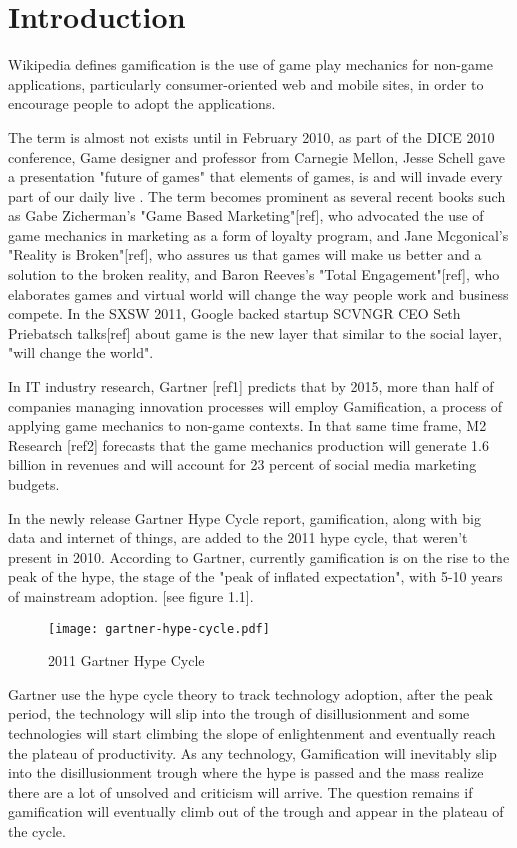 \chapter{Introduction}

Wikipedia defines gamification is the use of game play mechanics for non-game applications, particularly consumer-oriented web and mobile sites, in order to encourage people to adopt the applications. 

The term is almost not exists until in February 2010, as part of the DICE 2010 conference, Game designer and professor from Carnegie Mellon, Jesse Schell gave a presentation "future of games" that elements of games, is and will invade every part of our daily live \cite {schell2010design} . The term becomes prominent as several recent books such as Gabe Zicherman's "Game Based Marketing"[ref], who advocated the use of game mechanics in marketing as a form of loyalty program, and Jane Mcgonical's "Reality is Broken"[ref], who assures us that games will make us better and  a solution to the broken reality, and Baron Reeves's "Total Engagement"[ref], who elaborates  games and virtual world will change the way people work and business compete. In the  SXSW 2011, Google backed startup SCVNGR CEO Seth Priebatsch talks[ref] about game is the new layer that similar to the social layer, "will change the world".  

In IT industry research, Gartner [ref1] predicts that by 2015, more than half of companies managing innovation processes will employ Gamification, a process of applying game mechanics to non-game contexts. In that same time frame, M2 Research [ref2] forecasts that the game mechanics production will generate 1.6 billion in revenues and will account for 23 percent  of social media marketing budgets. 

In the newly release Gartner Hype Cycle report, gamification, along with big data and internet of things, are added to the 2011 hype cycle, that weren't present in 2010. According to Gartner, currently gamification is on the rise to the peak of the hype, the stage of the "peak of inflated expectation", with 5-10 years of mainstream adoption. [see figure 1.1]. 

\begin{figure}[htbp]
	\centering
		\texttt{[image: gartner-hype-cycle.pdf]}
		\caption{2011 Gartner Hype Cycle}
		\label{fig:Gartner-2011-Hype-Cycle}
\end{figure}

Gartner use the hype cycle theory to track technology adoption, after the peak period, the technology will slip into the trough of disillusionment and some technologies will start climbing the slope of enlightenment and eventually reach the plateau of productivity.  As any technology, Gamification will inevitably slip into the disillusionment trough where the hype is passed and the mass realize there are a lot of unsolved and criticism will arrive. The question remains if gamification will eventually climb out of the trough and appear in the plateau of the cycle.

